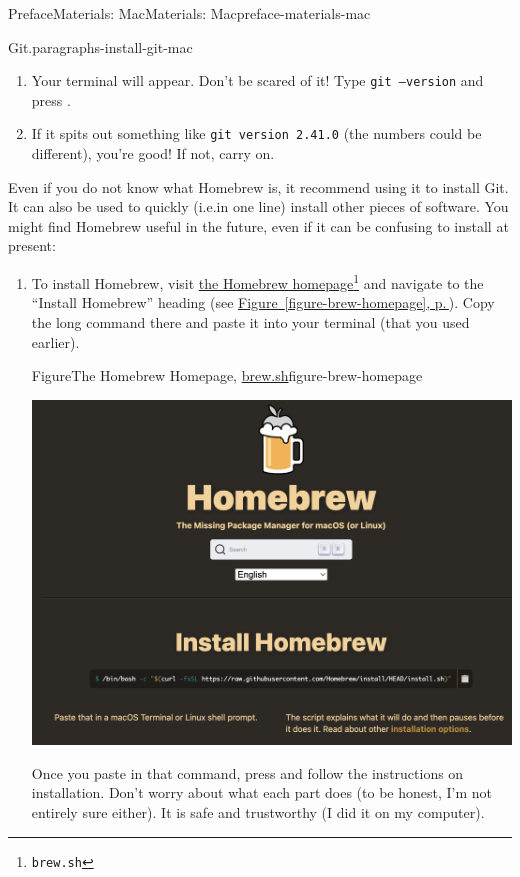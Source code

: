 \documentclass[twoside,10pt,]{book}
\newcommand{\xreffont}{\relax}
\newcommand{\mono}[1]{\texttt{#1}}
\newcommand{\kbd}[1]{\keys{{#1}}}
\begin{document}
\begin{preface}{Preface}{Materials: Mac}{}{Materials: Mac}{}{}{preface-materials-mac}
\begin{paragraphs}{Git.}{paragraphs-install-git-mac}
\begin{enumerate}
\item{}Your terminal will appear. Don't be scared of it! Type \mono{git --version} and press \kbd{Enter}.%
\item{}If it spits out something like \mono{git version 2.41.0} (the numbers could be different), you're good! If not, carry on.%
\end{enumerate}
%
\par
Even if you do not know what Homebrew is, it recommend using it to install Git. It can also be used to quickly (i.e.\@ in one line) install other pieces of software. You might find Homebrew useful in the future, even if it can be confusing to install at present:%
\begin{enumerate}
\item{}To install Homebrew, visit \href{https://brew.sh/}{the Homebrew homepage}\footnote{\nolinkurl{brew.sh}\label{fn-install-git-mac-c-b-a-a-b}} and navigate to the ``Install Homebrew'' heading (see \hyperref[figure-brew-homepage]{Figure~{\xreffont\ref{figure-brew-homepage}}, p.\,\pageref{figure-brew-homepage}}). Copy the long command there and paste it into your terminal (that you used earlier).%
\begin{figureptx}{Figure}{The Homebrew Homepage, \href{https://brew.sh/}{brew.sh}\protect\footnotemark{}}{figure-brew-homepage}{}%
\begin{image}{0.2}{0.6}{0.2}{}%
\includegraphics[width=\linewidth]{external/brew_homepage.pdf}
\end{image}%
\tcblower
\end{figureptx}%
%
Once you paste in that command, press \kbd{Enter} and follow the instructions on installation. Don't worry about what each part does (to be honest, I'm not entirely sure either). It is safe and trustworthy (I did it on my computer).%

\end{enumerate}
\end{paragraphs}
\end{preface}
\end{document}
